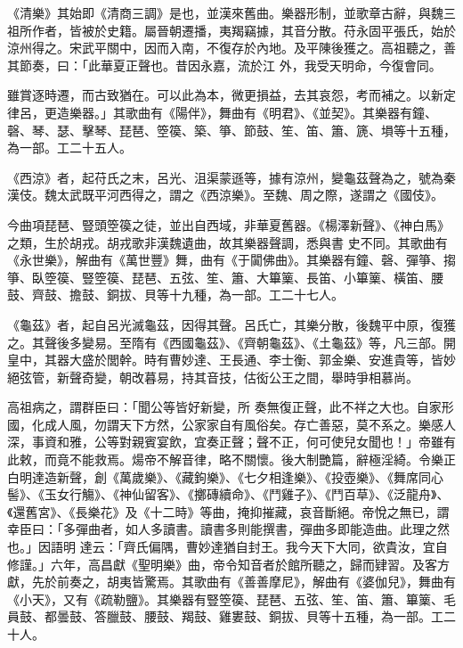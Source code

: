 \begin{pinyinscope}
 《清樂》其始即《清商三調》是也，並漢來舊曲。樂器形制，並歌章古辭，與魏三祖所作者，皆被於史籍。屬晉朝遷播，夷羯竊據，其音分散。苻永固平張氏，始於涼州得之。宋武平關中，因而入南，不復存於內地。及平陳後獲之。高祖聽之，善其節奏，曰：「此華夏正聲也。昔因永嘉，流於江
 外，我受天明命，今復會同。



 雖賞逐時遷，而古致猶在。可以此為本，微更損益，去其哀怨，考而補之。以新定律呂，更造樂器。」其歌曲有《陽伴》，舞曲有《明君》、《並契》。其樂器有鐘、磬、琴、瑟、擊琴、琵琶、箜篌、築、箏、節鼓、笙、笛、簫、篪、塤等十五種，為一部。工二十五人。



 《西涼》者，起苻氏之末，呂光、沮渠蒙遜等，據有涼州，變龜茲聲為之，號為秦漢伎。魏太武既平河西得之，謂之《西涼樂》。至魏、周之際，遂謂之《國伎》。



 今曲項琵琶、豎頭箜篌之徒，並出自西域，非華夏舊器。《楊澤新聲》、《神白馬》之類，生於胡戎。胡戎歌非漢魏遺曲，故其樂器聲調，悉與書
 史不同。其歌曲有《永世樂》，解曲有《萬世豐》舞，曲有《于闐佛曲》。其樂器有鐘、磬、彈箏、搊箏、臥箜篌、豎箜篌、琵琶、五弦、笙、簫、大篳篥、長笛、小篳篥、橫笛、腰鼓、齊鼓、擔鼓、銅拔、貝等十九種，為一部。工二十七人。



 《龜茲》者，起自呂光滅龜茲，因得其聲。呂氏亡，其樂分散，後魏平中原，復獲之。其聲後多變易。至隋有《西國龜茲》、《齊朝龜茲》、《土龜茲》等，凡三部。開皇中，其器大盛於閭幹。時有曹妙達、王長通、李士衡、郭金樂、安進貴等，皆妙絕弦管，新聲奇變，朝改暮易，持其音技，估衒公王之間，舉時爭相慕尚。



 高祖病之，謂群臣曰：「聞公等皆好新變，所
 奏無復正聲，此不祥之大也。自家形國，化成人風，勿謂天下方然，公家家自有風俗矣。存亡善惡，莫不系之。樂感人深，事資和雅，公等對親賓宴飲，宜奏正聲；聲不正，何可使兒女聞也！」帝雖有此敕，而竟不能救焉。煬帝不解音律，略不關懷。後大制艷篇，辭極淫綺。令樂正白明達造新聲，創《萬歲樂》、《藏鉤樂》、《七夕相逢樂》、《投壺樂》、《舞席同心髻》、《玉女行觴》、《神仙留客》、《擲磚續命》、《鬥雞子》、《鬥百草》、《泛龍舟》、《還舊宮》、《長樂花》及《十二時》等曲，掩抑摧藏，哀音斷絕。帝悅之無已，謂幸臣曰：「多彈曲者，如人多讀書。讀書多則能撰書，彈曲多即能造曲。此理之然也。」因語明
 達云：「齊氏偏隅，曹妙達猶自封王。我今天下大同，欲貴汝，宜自修謹。」六年，高昌獻《聖明樂》曲，帝令知音者於館所聽之，歸而肄習。及客方獻，先於前奏之，胡夷皆驚焉。其歌曲有《善善摩尼》，解曲有《婆伽兒》，舞曲有《小天》，又有《疏勒鹽》。其樂器有豎箜篌、琵琶、五弦、笙、笛、簫、篳篥、毛員鼓、都曇鼓、答臘鼓、腰鼓、羯鼓、雞婁鼓、銅拔、貝等十五種，為一部。工二十人。




\end{pinyinscope}
